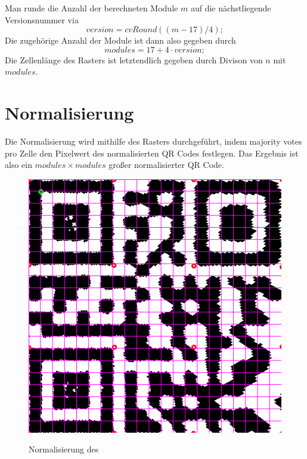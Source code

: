 Man runde die Anzahl der berechneten Module $m$ auf die nächstliegende Versionsnummer via
\begin{equation}
	version = cvRound((m-17)/4);
\end{equation}
Die zugehörige Anzahl der Module ist dann also gegeben durch
\begin{equation}
	modules = 17+4 \cdot version;
\end{equation} 
Die Zellenlänge des Rasters ist letztendlich gegeben durch Divison von $n$ mit $modules$.

\section{Normalisierung}
Die Normalisierung wird mithilfe des Rasters durchgeführt, indem majority votes pro Zelle den Pixelwert des normalisierten QR Codes festlegen.
Das Ergebnis ist also ein $modules \times modules$ großer normalisierter QR Code.
\begin{figure}[h]
\centering
\includegraphics[scale=0.3]{images/gitter.png}
\label{fig:version-qrcode}\caption{Normalisierung des \QRCode}
\end{figure}

